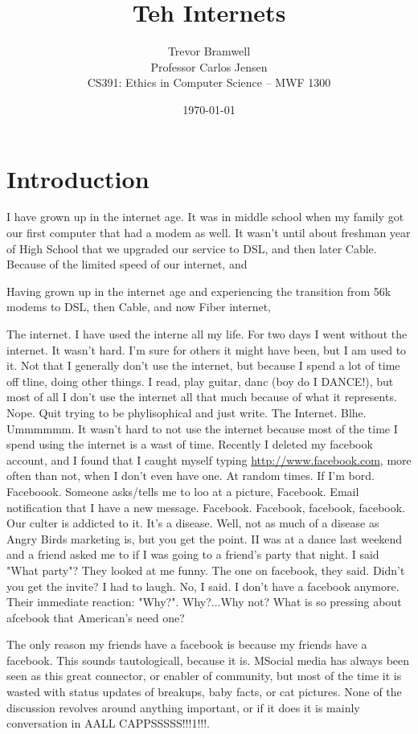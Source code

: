 \documentclass[12pt,letterpaper]{article}
\title{Teh Internets}
\author{
    Trevor Bramwell\\
    Professor Carlos Jensen\\
    CS391: Ethics in Computer Science -- MWF 1300\\
}
\date{\today}
\begin{document}
\maketitle

\section{Introduction}
I have grown up in the internet age. It was in  middle school when my
family got our first computer that had a modem as well. It wasn't until
about freshman year of High School that we upgraded our service to DSL,
and then later Cable. Because of the limited speed of our internet, and 

Having grown up in the internet age and experiencing the transition from
56k modems to DSL, then Cable, and now Fiber internet,  

The internet. I have used the interne all my life. For two days I went
without the internet. It wasn't hard. I'm sure for others it might have
been, but I am used to it. Not that I generally don't use the internet,
but because I spend a lot of time off tline, doing other things. I read,
play guitar, danc (boy do I DANCE!), but most of all I don't use the
internet all that much because of what it represents. Nope. Quit trying
to be phylisophical and just write. The Internet. Blhe. Ummmmmm. It
wasn't hard to not use the internet because most of the time I spend
using the internet is a wast of time. Recently I deleted my facebook
account, and I found that I caught myself typing \url{http://www.facebook.com}, more
often than not, when I don't even have one. At random times. If I'm
bord. Faceboook. Someone asks/tells me to loo at a picture, Facebook.
Email notification that I have a new message. Facebook. Facebook,
facebook, facebook. Our culter is addicted to it. It's a disease. Well,
not as much of a disease as Angry Birds marketing is, but you get the
point. II was at a dance last weekend and a friend asked me to if I was
going to a friend's party that night. I said "What party"? They looked
at me funny. The one on facebook, they said. Didn't you get the invite?
I had to laugh. No, I said. I don't have a facebook anymore. Their
immediate reaction: "Why?". Why?...Why not? What is so pressing about
afcebook that American's need one? 

The only reason my friends have a facebook is because my friends have a
facebook. This sounds tautologicall, because it is. MSocial media has
always been seen as this great connector, or enabler of community, but
most of the time it is wasted  with status updates of breakups, baby
facts, or cat pictures. None of the discussion revolves around anything
important, or if it does it is mainly conversation in AALL
CAPPSSSSS!!!1!!!.
\end{document}
